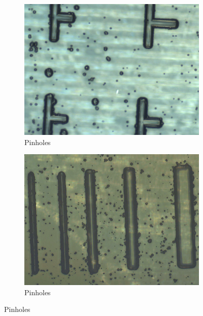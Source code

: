 \documentclass[final]{jyflluk}
\begin{document}

\begin{figure}[!h]
    \centering    
    \begin{subfigure}{0.48\textwidth}
        \centering
        \includegraphics[width=\linewidth]{optical/pinholes1.png} 
        \caption{Pinholes} \label{fig:pinhole1}
    \end{subfigure}
    \hfill
    \begin{subfigure}{0.48\textwidth}
        \centering
        \includegraphics[width=\linewidth]{optical/pinholes2.png} 
        \caption{Pinholes} \label{fig:pinhole2}
    \end{subfigure}
    

\end{figure}
\end{document}
